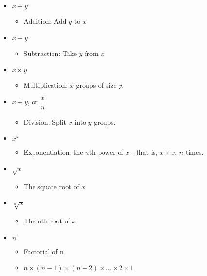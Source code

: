 \begin{itemize}	

\item $x + y$
\begin{itemize}
\item Addition: Add $y$ to $x$
\end{itemize}

\item $x - y$
\begin{itemize}
\item Subtraction: Take $y$ from $x$
\end{itemize}

\item $x\times y$
\begin{itemize}
\item Multiplication: $x$ groups of size $y$.
\end{itemize}

\item $x\div y$, or $\dfrac{x}{y}$
\begin{itemize}
\item Division: Split $x$ into $y$ groups.
\end{itemize}

\item $x^n$
\begin{itemize}
\item Exponentiation: the $n$th power of $x$ - that is, $x\times x$, $n$ times.
\end{itemize}

\item $\sqrt{x}$
\begin{itemize}
\item The square root of $x$
\end{itemize}

\item $\sqrt[n]{x}$
\begin{itemize}
\item The nth root of $x$
\end{itemize}

\item $n!$
\begin{itemize}
\item Factorial of n
\item $n \times (n-1) \times (n-2) \times \ldots \times 2 \times 1$
\end{itemize}


\end{itemize}
